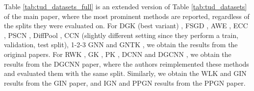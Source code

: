 \documentclass{article} \usepackage{iclr2021_conference,times}
\begin{document}
Table \ref{tab:tud_datasets_full} is an extended version of Table \ref{tab:tud_datasets} of the main paper, where the most prominent methods are reported, regardless of the splits they were evaluated on. For DGK (best variant) \citep{DBLP:conf/kdd/YanardagV15}, FSGD \citep{DBLP:conf/nips/VermaZ17}, AWE \citep{DBLP:conf/icml/IvanovB18},  ECC \citep{DBLP:conf/cvpr/SimonovskyK17}, PSCN \citep{DBLP:conf/icml/NiepertAK16},  DiffPool \citep{DBLP:conf/nips/YingY0RHL18}, CCN \citep{DBLP:conf/iclr/KondorSPAT18} (slightly different setting since they perform a train, validation, test split), 1-2-3 GNN \citep{morris2019weisfeiler} and GNTK \citep{DBLP:conf/nips/DuHSPWX19}, we obtain the results from the original papers. For RWK \citep{DBLP:conf/colt/GartnerFW03}, GK \citep{shervashidze2009efficient}, PK \citep{DBLP:journals/ml/NeumannGBK16}, DCNN \citep{DBLP:conf/nips/AtwoodT16} and DGCNN \citep{zhang2018end}, we obtain the results from the DGCNN paper, where the authors reimplemented these methods and evaluated them with the same split. Similarly, we obtain the WLK \citep{shervashidze2011weisfeiler} and GIN \citep{xu2018how} results from the GIN paper, and IGN \citep{DBLP:conf/iclr/MaronBSL19} and PPGN \citep{maron2019provably} results from the PPGN paper.
\end{document}
